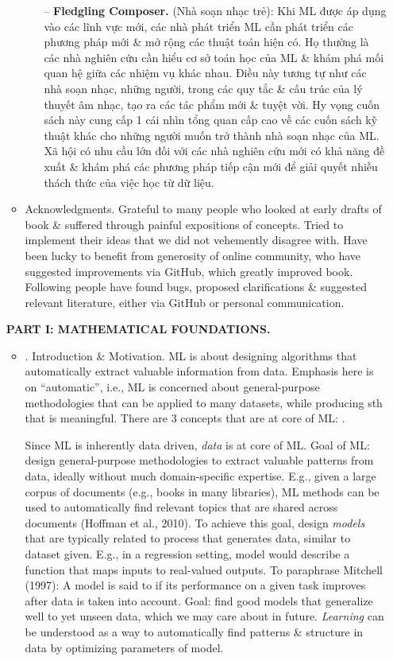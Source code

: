 \documentclass{article}
\begin{document}
\begin{enumerate}
\begin{itemize}
\begin{itemize}
			-- {\bf Fledgling Composer.} (Nhà soạn nhạc trẻ): Khi ML được áp dụng vào các lĩnh vực mới, các nhà phát triển ML cần phát triển các phương pháp mới \& mở rộng các thuật toán hiện có. Họ thường là các nhà nghiên cứu cần hiểu cơ sở toán học của ML \& khám phá mối quan hệ giữa các nhiệm vụ khác nhau. Điều này tương tự như các nhà soạn nhạc, những người, trong các quy tắc \& cấu trúc của lý thuyết âm nhạc, tạo ra các tác phẩm mới \& tuyệt vời. Hy vọng cuốn sách này cung cấp 1 cái nhìn tổng quan cấp cao về các cuốn sách kỹ thuật khác cho những người muốn trở thành nhà soạn nhạc của ML. Xã hội có nhu cầu lớn đối với các nhà nghiên cứu mới có khả năng đề xuất \& khám phá các phương pháp tiếp cận mới để giải quyết nhiều thách thức của việc học từ dữ liệu.
		\end{itemize}
		\item {\sf Acknowledgments.} Grateful to many people who looked at early drafts of book \& suffered through painful expositions of concepts. Tried to implement their ideas that we did not vehemently disagree with. Have been lucky to benefit from generosity of online community, who have suggested improvements via GitHub, which greatly improved book. Following people have found bugs, proposed clarifications \& suggested relevant literature, either via GitHub or personal communication.
	\end{itemize}	
	{\bf PART I: MATHEMATICAL FOUNDATIONS.}
	\begin{itemize}
		\item {. Introduction \& Motivation.} ML is about designing algorithms that automatically extract valuable information from data. Emphasis here is on ``automatic'', i.e., ML is concerned about general-purpose methodologies that can be applied to many datasets, while producing sth that is meaningful. There are 3 concepts that are at core of ML: .
		
		Since ML is inherently data driven, {\it data} is at core of ML. Goal of ML: design general-purpose methodologies to extract valuable patterns from data, ideally without much domain-specific expertise. E.g., given a large corpus of documents (e.g., books in many libraries), ML methods can be used to automatically find relevant topics that are shared across documents (Hoffman et al., 2010). To achieve this goal, design {\it models} that are typically related to process that generates data, similar to dataset given. E.g., in a regression setting, model would describe a function that maps inputs to real-valued outputs. To paraphrase Mitchell (1997): A model is said to  if its performance on a given task improves after data is taken into account. Goal: find good models that generalize well to yet unseen data, which we may care about in future. {\it Learning} can be understood as a way to automatically find patterns \& structure in data by optimizing parameters of model.
		

\end{itemize}
\end{enumerate}
\end{document}

